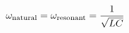 \documentclass[preview]{standalone}
\begin{document}
\begin{align*}
\omega_{\text{natural}} = \omega_{\text{resonant}} =  {1 \over \sqrt{ L C}}
\end{align*}
\end{document}
